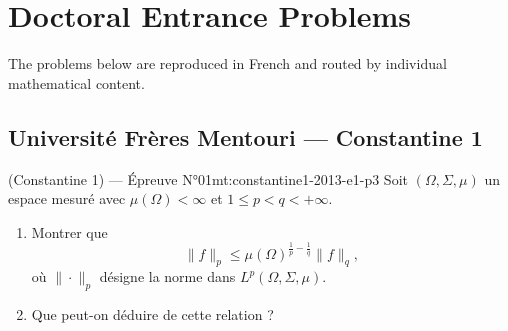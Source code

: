 \chapter{Doctoral Entrance Problems}
\label{ch:problems}

The problems below are reproduced in French and routed by individual mathematical content.
\newpage

\section{Université Frères Mentouri --- Constantine 1}
\begin{problem}{(Constantine 1) — Épreuve N°01}{mt:constantine1-2013-e1-p3}
Soit $(\Omega,\Sigma,\mu)$ un espace mesuré avec $\mu(\Omega)<\infty$ et $1\le p<q<+\infty$.
\begin{enumerate}\item Montrer que
$$\|f\|_p\le\mu(\Omega)^{\frac1p-\frac1q}\|f\|_q,$$
où $\|\cdot\|_p$ désigne la norme dans $L^p(\Omega,\Sigma,\mu)$.\item Que peut-on déduire de cette relation ?\end{enumerate}
\end{problem}
